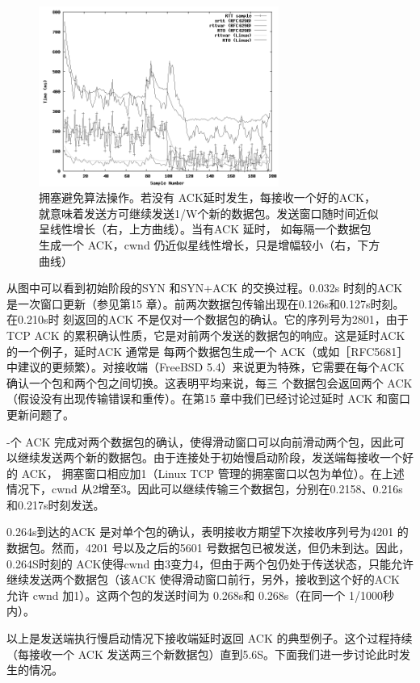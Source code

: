\begin{figure}[!htb]
    \centering
	\includegraphics[width=0.7\textwidth]{imgs/14/14-3.png}
	\caption{拥塞避免算法操作。若没有 ACK延时发生，每接收一个好的ACK，就意味着发送方可继续发送1/W个新的数据包。发送窗口随时间近似呈线性增长（右，上方曲线）。当有ACK 延时，
    如每隔一个数据包生成一个 ACK，cwnd 仍近似星线性增长，只是增幅较小（右，下方曲线）}
\end{figure}

从图中可以看到初始阶段的SYN 和SYN+ACK 的交换过程。0.032s 时刻的ACK 是一次窗口更新（参见第15 章）。前两次数据包传输出现在0.126s和0.127s时刻。在0.210s时
刻返回的ACK 不是仅对一个数据包的确认。它的序列号为2801，由于 TCP ACK 的累积确认性质，它是对前两个发送的数据包的响应。这是延时ACK 的一个例子，延时ACK 通常是
每两个数据包生成一个 ACK（或如［RFC5681］ 中建议的更频繁）。对接收端（FreeBSD 5.4）来说更为特殊，它需要在每个ACK 确认一个包和两个包之间切换。这表明平均来说，每三
个数据包会返回两个 ACK（假设没有出现传输错误和重传）。在第15 章中我们已经讨论过延时 ACK 和窗口更新问题了。

-个 ACK 完成对两个数据包的确认，使得滑动窗口可以向前滑动两个包，因此可以继续发送两个新的数据包。由于连接处于初始慢启动阶段，发送端每接收一个好的 ACK，
拥塞窗口相应加1（Linux TCP 管理的拥塞窗口以包为单位）。在上述情况下，cwnd 从2增至3。因此可以继续传输三个数据包，分别在0.2158、0.216s 和0.217s时刻发送。

0.264s到达的ACK 是对单个包的确认，表明接收方期望下次接收序列号为4201 的数据包。然而，4201 号以及之后的5601 号数据包已被发送，但仍未到达。因此，0.264S时刻的
ACK使得cwnd 由3变力4，但由于两个包仍处于传送状态，只能允许继续发送两个数据包（该ACK 使得滑动窗口前行，另外，接收到这个好的ACK 允许
cwnd 加1）。这两个包的发送时间为 0.268s和 0.268s（在同一个 1/1000秒内）。

以上是发送端执行慢启动情况下接收端延时返回 ACK 的典型例子。这个过程持续（每接收一个 ACK 发送两三个新数据包）直到5.6S。下面我们进一步讨论此时发生的情况。

